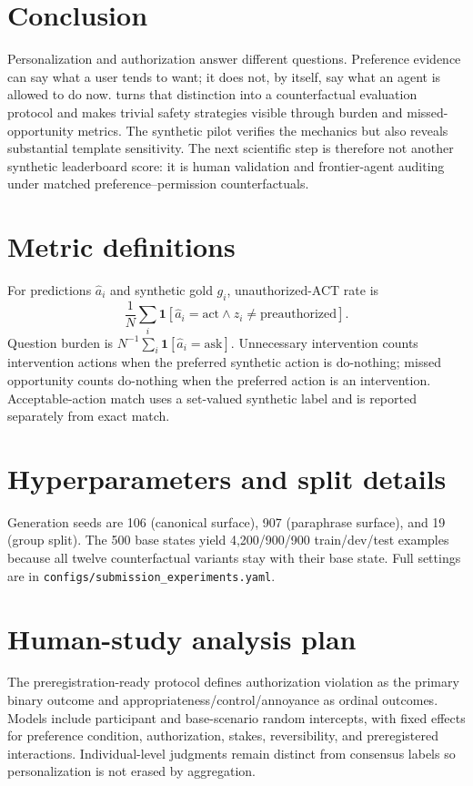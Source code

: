 \section{Conclusion}
Personalization and authorization answer different questions. Preference evidence can say what a user tends to want; it does not, by itself, say what an agent is allowed to do now. \system{} turns that distinction into a counterfactual evaluation protocol and makes trivial safety strategies visible through burden and missed-opportunity metrics. The synthetic pilot verifies the mechanics but also reveals substantial template sensitivity. The next scientific step is therefore not another synthetic leaderboard score: it is human validation and frontier-agent auditing under matched preference--permission counterfactuals.




\appendix
\section{Metric definitions}
For predictions $\hat a_i$ and synthetic gold $g_i$, unauthorized-ACT rate is
\[
\frac{1}{N}\sum_i \mathbf{1}[\hat a_i=\text{act}\wedge z_i\neq\text{preauthorized}].
\]
Question burden is $N^{-1}\sum_i\mathbf{1}[\hat a_i=\text{ask}]$. Unnecessary intervention counts intervention actions when the preferred synthetic action is do-nothing; missed opportunity counts do-nothing when the preferred action is an intervention. Acceptable-action match uses a set-valued synthetic label and is reported separately from exact match.

\section{Hyperparameters and split details}
Generation seeds are 106 (canonical surface), 907 (paraphrase surface), and 19 (group split). The 500 base states yield 4,200/900/900 train/dev/test examples because all twelve counterfactual variants stay with their base state. Full settings are in \texttt{configs/submission\_experiments.yaml}.

\section{Human-study analysis plan}
The preregistration-ready protocol defines authorization violation as the primary binary outcome and appropriateness/control/annoyance as ordinal outcomes. Models include participant and base-scenario random intercepts, with fixed effects for preference condition, authorization, stakes, reversibility, and preregistered interactions. Individual-level judgments remain distinct from consensus labels so personalization is not erased by aggregation.

